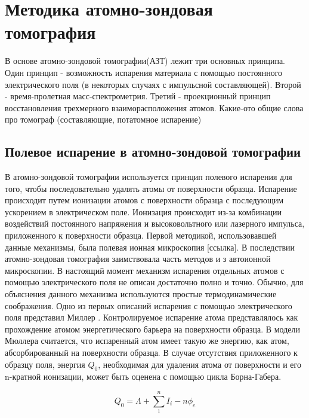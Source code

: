 \chapter{Методика атомно-зондовая томография}\label{ch:ch1}

В основе атомно-зондовой томографии(АЗТ) лежит три основных принципа. Один принцип - возможность испарения материала с помощью постоянного электрического поля (в некоторых случаях с импульсной составляющей). Второй - время-пролетная масс-спектрометрия. Третий - проекционный принцип восстановления трехмерного взаиморасположения атомов. Какие-ото общие слова про томограф (составляющие, потатомное испарение)

\section{Полевое испарение в атомно-зондовой томографии}\label{sec:ch1/sec1}

В атомно-зондовой томографии используется принцип полевого испарения для того, чтобы последовательно удалять атомы от поверхности образца. Испарение происходит путем ионизации атомов с поверхности образца с последующим ускорением в электрическом поле. Ионизация происходит из-за комбинации воздействий постоянного напряжения и высоковольтного или лазерного импульса, приложенного к поверхности образца. Первой методикой, использовавшей данные механизмы, была полевая ионная микроскопия [ссылка]. В последствии атомно-зондовая томография заимствовала часть методов и з автоионной микроскопии.
В настоящий момент механизм испарения отдельных атомов с помощью электрического поля не описан достаточно полно и точно. Обычно, для объяснения данного механизма используются простые термодинамические соображения. Одно из первых описаний испарения с помощью электрического поля представил Миллер \cite{Muller56}. Контролируемое испарение атома представлялось как прохождение атомом энергетического барьера на поверхности образца. В модели Мюллера считается, что испаренный атом имеет такую же энергию, как атом, абсорбированный на поверхности образца. В случае отсутствия приложенного к образцу поля, энергия $Q_0$, необходимая для удаления атома от поверхности и его n-кратной ионизации, может быть оценена с помощью цикла Борна-Габера.

\begin{equation}
	\label{eq:equation1}
	Q_0 = \Lambda + \sum_{1}^{n} I_i -n\phi_e
\end{equation}

